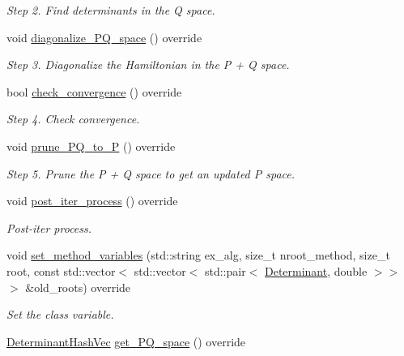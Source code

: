 \begin{DoxyCompactItemize}
\begin{DoxyCompactList}\small\item\em Step 2. Find determinants in the Q space. \end{DoxyCompactList}\item 
void \mbox{\hyperlink{classforte_1_1_projector_c_i_ae61e5b098015659c30198655fe0b2679}{diagonalize\+\_\+\+P\+Q\+\_\+space}} () override
\begin{DoxyCompactList}\small\item\em Step 3. Diagonalize the Hamiltonian in the P + Q space. \end{DoxyCompactList}\item 
bool \mbox{\hyperlink{classforte_1_1_projector_c_i_a92835e4b67f74340959ef8c4503ce241}{check\+\_\+convergence}} () override
\begin{DoxyCompactList}\small\item\em Step 4. Check convergence. \end{DoxyCompactList}\item 
void \mbox{\hyperlink{classforte_1_1_projector_c_i_a2f37b3d1e1751cc6bea1177a70be675c}{prune\+\_\+\+P\+Q\+\_\+to\+\_\+P}} () override
\begin{DoxyCompactList}\small\item\em Step 5. Prune the P + Q space to get an updated P space. \end{DoxyCompactList}\item 
void \mbox{\hyperlink{classforte_1_1_projector_c_i_a9d7d491168cfe782b51d3393f4b77630}{post\+\_\+iter\+\_\+process}} () override
\begin{DoxyCompactList}\small\item\em Post-\/iter process. \end{DoxyCompactList}\item 
void \mbox{\hyperlink{classforte_1_1_projector_c_i_af52dd5970339c390a9884b1cdad0a1d7}{set\+\_\+method\+\_\+variables}} (std\+::string ex\+\_\+alg, size\+\_\+t nroot\+\_\+method, size\+\_\+t root, const std\+::vector$<$ std\+::vector$<$ std\+::pair$<$ \mbox{\hyperlink{namespaceforte_a2076c63fd7b8732004d9e1442ce527c1}{Determinant}}, double $>$$>$$>$ \&old\+\_\+roots) override
\begin{DoxyCompactList}\small\item\em Set the class variable. \end{DoxyCompactList}\item 
\mbox{\hyperlink{classforte_1_1_determinant_hash_vec}{Determinant\+Hash\+Vec}} \mbox{\hyperlink{classforte_1_1_projector_c_i_aa666615f222bd2263b1199910b2bbbcc}{get\+\_\+\+P\+Q\+\_\+space}} () override

\end{DoxyCompactItemize}
